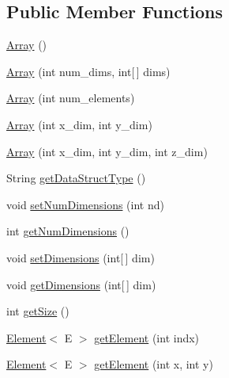 \subsection*{Public Member Functions}
\begin{DoxyCompactItemize}
\item 
\mbox{\hyperlink{classbridges_1_1base_1_1_array_ad5dbf7bbd9811c2dac16a5c135465d4b}{Array}} ()
\item 
\mbox{\hyperlink{classbridges_1_1base_1_1_array_ab37dbe6efe0c34242456971e430763f7}{Array}} (int num\+\_\+dims, int\mbox{[}$\,$\mbox{]} dims)
\item 
\mbox{\hyperlink{classbridges_1_1base_1_1_array_acd4d14ab49b5d17ec2fb7a9234d31b4f}{Array}} (int num\+\_\+elements)
\item 
\mbox{\hyperlink{classbridges_1_1base_1_1_array_a2bdb4561fdbe033328db9febf636c23b}{Array}} (int x\+\_\+dim, int y\+\_\+dim)
\item 
\mbox{\hyperlink{classbridges_1_1base_1_1_array_a04dd28aef8d7597ad91bd2650d390506}{Array}} (int x\+\_\+dim, int y\+\_\+dim, int z\+\_\+dim)
\item 
String \mbox{\hyperlink{classbridges_1_1base_1_1_array_ad138b9787d46d053d6bd324b344be9a6}{get\+Data\+Struct\+Type}} ()
\item 
void \mbox{\hyperlink{classbridges_1_1base_1_1_array_ab7859668a25d16adfdb308e24c7d44c6}{set\+Num\+Dimensions}} (int nd)
\item 
int \mbox{\hyperlink{classbridges_1_1base_1_1_array_a808da9a62df3f0e7a905ec895a82087a}{get\+Num\+Dimensions}} ()
\item 
void \mbox{\hyperlink{classbridges_1_1base_1_1_array_a7ec1260b85f7353ec00c873cf719eea1}{set\+Dimensions}} (int\mbox{[}$\,$\mbox{]} dim)
\item 
void \mbox{\hyperlink{classbridges_1_1base_1_1_array_af7aa7f3f18989af5f48a2b69cb7fb07d}{get\+Dimensions}} (int\mbox{[}$\,$\mbox{]} dim)
\item 
int \mbox{\hyperlink{classbridges_1_1base_1_1_array_a49a3a4ea72c8315f1f14eed25071d18a}{get\+Size}} ()
\item 
\mbox{\hyperlink{classbridges_1_1base_1_1_element}{Element}}$<$ E $>$ \mbox{\hyperlink{classbridges_1_1base_1_1_array_a0e690cbe2606e44cce99b56802b63e0e}{get\+Element}} (int indx)
\item 
\mbox{\hyperlink{classbridges_1_1base_1_1_element}{Element}}$<$ E $>$ \mbox{\hyperlink{classbridges_1_1base_1_1_array_a9eff153c6b63572c18af6194c66ca34c}{get\+Element}} (int x, int y)
\item 

\end{DoxyCompactItemize}
